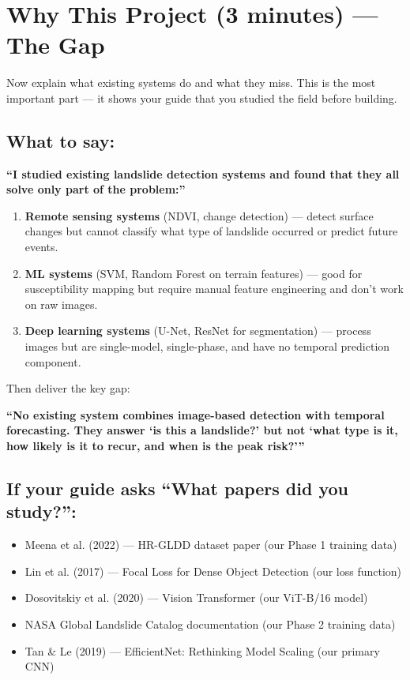 \documentclass[11pt]{article}
\begin{document}
\section{Why This Project (3 minutes) --- The Gap}

Now explain what existing systems do and what they miss. This is the most important part --- it shows your guide that you studied the field before building.

\subsection{What to say:}

\textbf{``I studied existing landslide detection systems and found that they all solve only part of the problem:''}

\begin{enumerate}[noitemsep]
    \item \textbf{Remote sensing systems} (NDVI, change detection) --- detect surface changes but cannot classify what type of landslide occurred or predict future events.
    \item \textbf{ML systems} (SVM, Random Forest on terrain features) --- good for susceptibility mapping but require manual feature engineering and don't work on raw images.
    \item \textbf{Deep learning systems} (U-Net, ResNet for segmentation) --- process images but are single-model, single-phase, and have no temporal prediction component.
\end{enumerate}

Then deliver the key gap:

\textbf{``No existing system combines image-based detection with temporal forecasting. They answer `is this a landslide?' but not `what type is it, how likely is it to recur, and when is the peak risk?'''}

\subsection{If your guide asks ``What papers did you study?'':}

\begin{itemize}[noitemsep]
    \item Meena et al. (2022) --- HR-GLDD dataset paper (our Phase 1 training data)
    \item Lin et al. (2017) --- Focal Loss for Dense Object Detection (our loss function)
    \item Dosovitskiy et al. (2020) --- Vision Transformer (our ViT-B/16 model)
    \item NASA Global Landslide Catalog documentation (our Phase 2 training data)
    \item Tan \& Le (2019) --- EfficientNet: Rethinking Model Scaling (our primary CNN)
\end{itemize}
\end{document}
